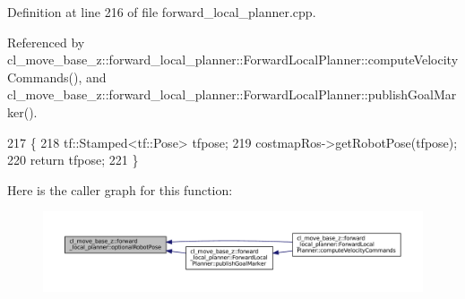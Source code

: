 Definition at line 216 of file forward\+\_\+local\+\_\+planner.\+cpp.



Referenced by cl\+\_\+move\+\_\+base\+\_\+z\+::forward\+\_\+local\+\_\+planner\+::\+Forward\+Local\+Planner\+::compute\+Velocity\+Commands(), and cl\+\_\+move\+\_\+base\+\_\+z\+::forward\+\_\+local\+\_\+planner\+::\+Forward\+Local\+Planner\+::publish\+Goal\+Marker().


\begin{DoxyCode}
217 \{
218     tf::Stamped<tf::Pose> tfpose;
219     costmapRos->getRobotPose(tfpose);
220     \textcolor{keywordflow}{return} tfpose;
221 \}
\end{DoxyCode}
Here is the caller graph for this function\+:
\nopagebreak
\begin{figure}[H]
\begin{center}
\leavevmode
\includegraphics[width=350pt]{namespacecl__move__base__z_1_1forward__local__planner_a4c20f9fe0ca67779c53e90182baf4997_icgraph}
\end{center}
\end{figure}
